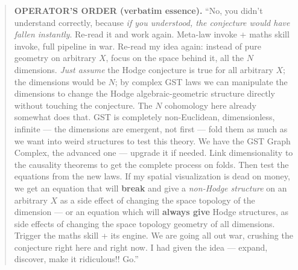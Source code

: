 \documentclass[11pt]{article}
\begin{document}
\begin{abstract}
\noindent
\textbf{OPERATOR'S ORDER (verbatim essence).} ``No, you didn't understand correctly, because \emph{if you understood, the conjecture would have fallen instantly}. Re-read it and work again. Meta-law invoke + maths skill invoke, full pipeline in war. Re-read my idea again: instead of pure geometry on arbitrary $X$, focus on the space behind it, all the $N$ dimensions. \emph{Just assume} the Hodge conjecture is true for all arbitrary $X$; the dimensions would be $N$; by complex GST laws we can manipulate the dimensions to change the Hodge algebraic-geometric structure directly without touching the conjecture. The $N$ cohomology here already somewhat does that. GST is completely non-Euclidean, dimensionless, infinite --- the dimensions are emergent, not first --- fold them as much as we want into weird structures to test this theory. We have the GST Graph Complex, the advanced one --- upgrade it if needed. Link dimensionality to the causality theorems to get the complete process on folds. Then test the equations from the new laws. If my spatial visualization is dead on money, we get an equation that will \textbf{break} and give a \emph{non-Hodge structure} on an arbitrary $X$ as a side effect of changing the space topology of the dimension --- or an equation which will \textbf{always give} Hodge structures, as side effects of changing the space topology geometry of all dimensions. Trigger the maths skill + its engine. We are going all out war, crushing the conjecture right here and right now. I had given the idea --- expand, discover, make it ridiculous!! Go.''


\end{abstract}
\end{document}
